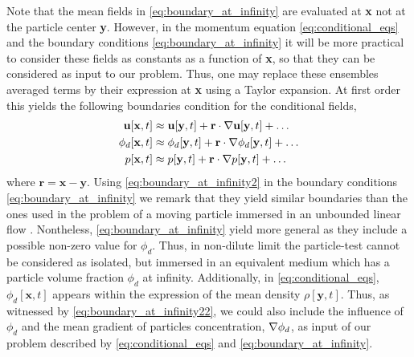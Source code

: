 Note that the mean fields in \ref{eq:boundary_at_infinity} are evaluated at \textbf{x} not at the particle center \textbf{y}.
However, in the momentum equation \eqref{eq:conditional_eqs} and the boundary conditions \ref{eq:boundary_at_infinity} it will be more practical to consider these fields as constants as a function of \textbf{x}, so that they can be considered as input to our problem. 
Thus, one may replace these ensembles averaged terms by their expression at \textbf{x} using a Taylor expansion. 
At first order this yields the following boundaries condition for the conditional fields, 
\begin{align}
    \textbf{u}[\textbf{x},t] 
    &\approx \textbf{u}[\textbf{y},t] 
    + \textbf{r}\cdot \grad\textbf{u}[\textbf{y},t] 
    \label{eq:boundary_at_infinity23}
    + \ldots\\
    \phi_d[\textbf{x},t] 
    &\approx \phi_d[\textbf{y},t] 
    \label{eq:boundary_at_infinity22}
    + \textbf{r}\cdot \grad \phi_d[\textbf{y},t]  
    + \ldots\\
    p[\textbf{x},t] 
    &\approx p[\textbf{y},t] 
    + \textbf{r}\cdot  \grad p[\textbf{y},t] 
    + \ldots
    \label{eq:boundary_at_infinity2}
\end{align}
where $\textbf{r} = \textbf{x} - \textbf{y}$. 
Using \ref{eq:boundary_at_infinity2} in the boundary conditions \eqref{eq:boundary_at_infinity} we remark that they yield similar boundaries than the ones used in the problem of a moving particle immersed in an unbounded linear flow \citep{jackson1997locally,zhang1997momentum}. 
Nontheless,  \ref{eq:boundary_at_infinity} yield more general as they include a possible non-zero value for $\phi_d$. 
Thus, in non-dilute limit the particle-test cannot be considered as isolated, but immersed in an equivalent medium which has a particle volume fraction $\phi_d$ at infinity. 
Additionally, in \ref{eq:conditional_eqs}, $\phi_d[\textbf{x},t]$ appears within the expression of the mean density $\rho[\textbf{y},t]$. 
Thus, as witnessed by \ref{eq:boundary_at_infinity22}, we could also include the influence of $\phi_d$ and the mean gradient of particles concentration, $\mathbf{\nabla} \phi_d$, as input of our problem described by \eqref{eq:conditional_eqs} and \ref{eq:boundary_at_infinity}.


